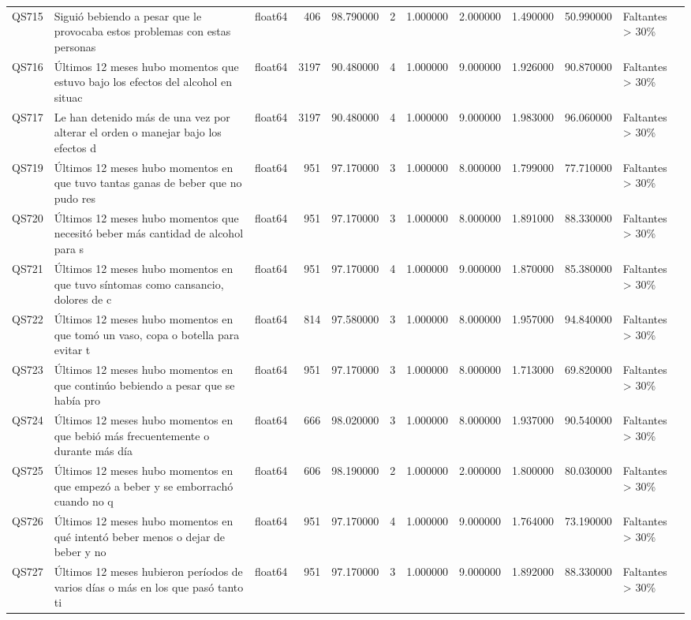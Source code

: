 \begin{longtable}{lllrrrrrrrl}
QS715 & Siguió bebiendo a pesar que le provocaba estos problemas con estas personas & float64 & 406 & 98.790000 & 2 & 1.000000 & 2.000000 & 1.490000 & 50.990000 & Faltantes > 30\% \\
QS716 & Últimos 12 meses hubo momentos que estuvo bajo los efectos del alcohol en situac & float64 & 3197 & 90.480000 & 4 & 1.000000 & 9.000000 & 1.926000 & 90.870000 & Faltantes > 30\% \\
QS717 & Le han detenido más de una vez por alterar el orden o manejar bajo los efectos d & float64 & 3197 & 90.480000 & 4 & 1.000000 & 9.000000 & 1.983000 & 96.060000 & Faltantes > 30\% \\
QS719 & Últimos 12 meses hubo momentos en que tuvo tantas ganas de beber que no pudo res & float64 & 951 & 97.170000 & 3 & 1.000000 & 8.000000 & 1.799000 & 77.710000 & Faltantes > 30\% \\
QS720 & Últimos 12 meses hubo momentos que necesitó beber más cantidad de alcohol para s & float64 & 951 & 97.170000 & 3 & 1.000000 & 8.000000 & 1.891000 & 88.330000 & Faltantes > 30\% \\
QS721 & Últimos 12 meses hubo momentos en que tuvo síntomas como cansancio, dolores de c & float64 & 951 & 97.170000 & 4 & 1.000000 & 9.000000 & 1.870000 & 85.380000 & Faltantes > 30\% \\
QS722 & Últimos 12 meses hubo momentos en que tomó un vaso, copa o botella para evitar t & float64 & 814 & 97.580000 & 3 & 1.000000 & 8.000000 & 1.957000 & 94.840000 & Faltantes > 30\% \\
QS723 & Últimos 12 meses hubo momentos en que continúo bebiendo a pesar que se había pro & float64 & 951 & 97.170000 & 3 & 1.000000 & 8.000000 & 1.713000 & 69.820000 & Faltantes > 30\% \\
QS724 & Últimos 12 meses hubo momentos en que bebió más frecuentemente o durante más día & float64 & 666 & 98.020000 & 3 & 1.000000 & 8.000000 & 1.937000 & 90.540000 & Faltantes > 30\% \\
QS725 & Últimos 12 meses hubo momentos en que empezó a beber y se emborrachó cuando no q & float64 & 606 & 98.190000 & 2 & 1.000000 & 2.000000 & 1.800000 & 80.030000 & Faltantes > 30\% \\
QS726 & Últimos 12 meses hubo momentos en qué intentó beber menos o dejar de beber y no  & float64 & 951 & 97.170000 & 4 & 1.000000 & 9.000000 & 1.764000 & 73.190000 & Faltantes > 30\% \\
QS727 & Últimos 12 meses hubieron períodos de varios días o más en los que pasó tanto ti & float64 & 951 & 97.170000 & 3 & 1.000000 & 9.000000 & 1.892000 & 88.330000 & Faltantes > 30\% \\

\end{longtable}
